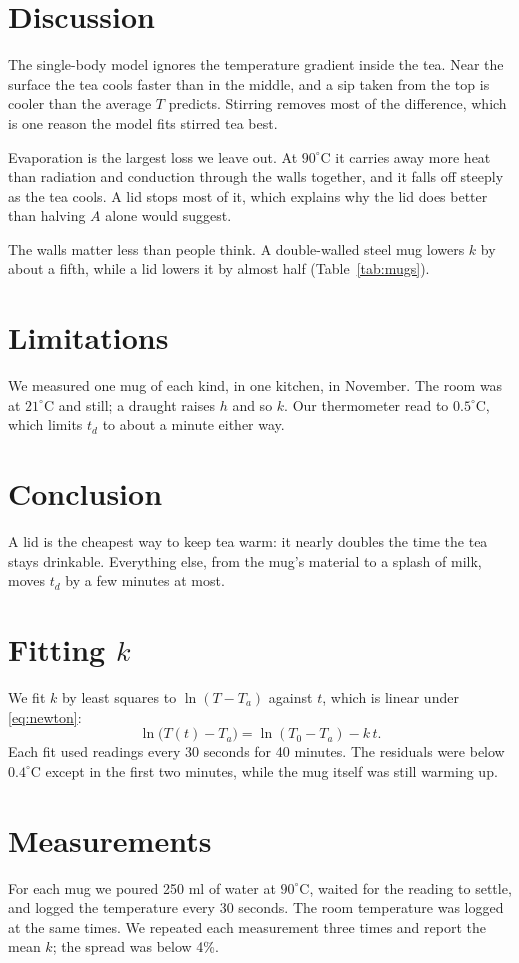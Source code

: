 \documentclass[11pt]{article}
\begin{document}
\section{Discussion}
The single-body model ignores the temperature gradient inside the tea. Near the surface the tea cools
faster than in the middle, and a sip taken from the top is cooler than the average $T$ predicts.
Stirring removes most of the difference, which is one reason the model fits stirred tea best.

Evaporation is the largest loss we leave out. At $90^\circ$C it carries away more heat than
radiation and conduction through the walls together, and it falls off steeply as the tea cools.
A lid stops most of it, which explains why the lid does better than halving $A$ alone would suggest.

The walls matter less than people think. A double-walled steel mug lowers $k$ by about a fifth,
while a lid lowers it by almost half (Table~\ref{tab:mugs}).

\section{Limitations}
We measured one mug of each kind, in one kitchen, in November. The room was at $21^\circ$C and
still; a draught raises $h$ and so $k$. Our thermometer read to $0.5^\circ$C, which limits $t_d$
to about a minute either way.

\section{Conclusion}
A lid is the cheapest way to keep tea warm: it nearly doubles the time the tea stays drinkable.
Everything else, from the mug's material to a splash of milk, moves $t_d$ by a few minutes at most.

\appendix
\section{Fitting $k$}
We fit $k$ by least squares to $\ln(T - T_a)$ against $t$, which is linear under \eqref{eq:newton}:
\[
  \ln\bigl(T(t) - T_a\bigr) = \ln(T_0 - T_a) - k\,t .
\]
Each fit used readings every 30 seconds for 40 minutes. The residuals were below $0.4^\circ$C
except in the first two minutes, while the mug itself was still warming up.

\section{Measurements}
For each mug we poured 250 ml of water at $90^\circ$C, waited for the reading to settle, and logged
the temperature every 30 seconds. The room temperature was logged at the same times.
We repeated each measurement three times and report the mean $k$; the spread was below 4\%.
\end{document}
